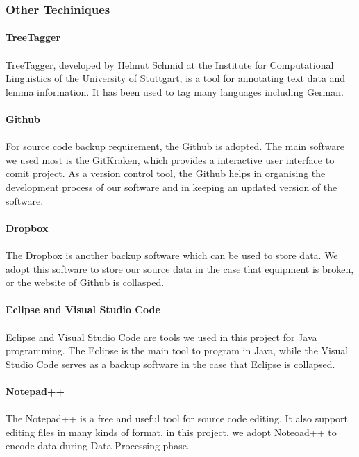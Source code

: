 \subsubsection{Other Techiniques}

\paragraph{TreeTagger}
\paragraph[]{}TreeTagger, developed by Helmut Schmid at the Institute for Computational Linguistics of the University of Stuttgart, is a tool for annotating text data and lemma information. It has been used to tag many languages including German.

\paragraph{Github}
\paragraph[]{} For source code backup requirement, the Github is adopted. The main software we used most is the GitKraken, which provides a interactive user interface to comit project. As a version control tool, the Github helps in organising the development process of our software and in keeping an updated version of the software.

\paragraph{Dropbox}
\paragraph[]{} The Dropbox is another backup software which can be used to store data. We adopt this software to store our source data in the case that equipment is broken, or the website of Github is collasped.

\paragraph{Eclipse and Visual Studio Code}
\paragraph[]{} Eclipse and Visual Studio Code are tools we used in this project for Java programming. The Eclipse is the main tool to program in Java, while the Visual Studio Code serves as a backup software in the case that Eclipse is collapsed. 

\paragraph{Notepad++}
\paragraph[]{}The Notepad++ is a free and useful tool for source code editing. It also support editing files in many kinds of format. in this project, we adopt Noteoad++ to encode data during Data Processing phase.
